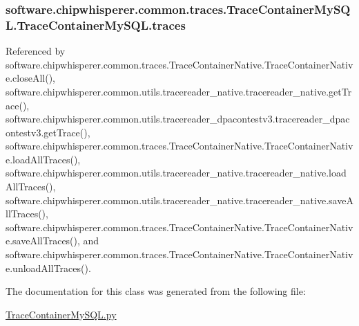 \subsubsection[{traces}]{\setlength{\rightskip}{0pt plus 5cm}software.\+chipwhisperer.\+common.\+traces.\+Trace\+Container\+My\+S\+Q\+L.\+Trace\+Container\+My\+S\+Q\+L.\+traces}\label{classsoftware_1_1chipwhisperer_1_1common_1_1traces_1_1TraceContainerMySQL_1_1TraceContainerMySQL_a88a0ccb5f2231cec74b1642f34979def}


Referenced by software.\+chipwhisperer.\+common.\+traces.\+Trace\+Container\+Native.\+Trace\+Container\+Native.\+close\+All(), software.\+chipwhisperer.\+common.\+utils.\+tracereader\+\_\+native.\+tracereader\+\_\+native.\+get\+Trace(), software.\+chipwhisperer.\+common.\+utils.\+tracereader\+\_\+dpacontestv3.\+tracereader\+\_\+dpacontestv3.\+get\+Trace(), software.\+chipwhisperer.\+common.\+traces.\+Trace\+Container\+Native.\+Trace\+Container\+Native.\+load\+All\+Traces(), software.\+chipwhisperer.\+common.\+utils.\+tracereader\+\_\+native.\+tracereader\+\_\+native.\+load\+All\+Traces(), software.\+chipwhisperer.\+common.\+utils.\+tracereader\+\_\+native.\+tracereader\+\_\+native.\+save\+All\+Traces(), software.\+chipwhisperer.\+common.\+traces.\+Trace\+Container\+Native.\+Trace\+Container\+Native.\+save\+All\+Traces(), and software.\+chipwhisperer.\+common.\+traces.\+Trace\+Container\+Native.\+Trace\+Container\+Native.\+unload\+All\+Traces().



The documentation for this class was generated from the following file\+:\begin{DoxyCompactItemize}
\item 
\hyperlink{TraceContainerMySQL_8py}{Trace\+Container\+My\+S\+Q\+L.\+py}\end{DoxyCompactItemize}

